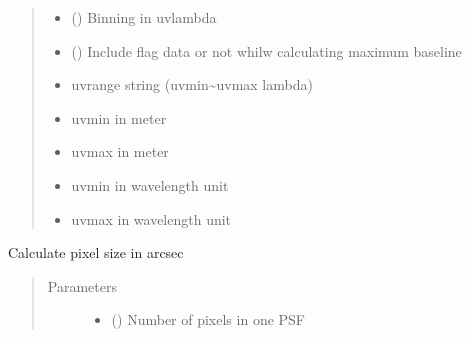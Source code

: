 \documentclass[letterpaper,10pt,english]{sphinxmanual}
\begin{document}
\begin{fulllineitems}
\begin{fulllineitems}
\begin{quote}
\begin{description}
\begin{itemize}
\item {} 
\sphinxAtStartPar
{} () \textendash{} Binning in uv\sphinxhyphen{}lambda

\item {} 
\sphinxAtStartPar
{} () \textendash{} Include flag data or not whilw calculating maximum baseline

\end{itemize}

\item[{Returns}] \leavevmode
\sphinxAtStartPar
\begin{itemize}
\item {} 
\sphinxAtStartPar
{} \textendash{} uv\sphinxhyphen{}range string (uvmin\textasciitilde{}uvmax lambda)

\item {} 
\sphinxAtStartPar
{} \textendash{} uvmin in meter

\item {} 
\sphinxAtStartPar
{} \textendash{} uvmax in meter

\item {} 
\sphinxAtStartPar
{} \textendash{} uvmin in wavelength unit

\item {} 
\sphinxAtStartPar
{} \textendash{} uvmax in wavelength unit

\end{itemize}


\end{description}\end{quote}

\end{fulllineitems}


\begin{fulllineitems}
\label{\detokenize{paircars:paircars.basic_func.ImageBasic.calc_cellsize}}
\sphinxAtStartPar
Calculate pixel size in arcsec
\begin{quote}\begin{description}
\item[{Parameters}] \leavevmode\begin{itemize}
\item {} 
\sphinxAtStartPar
{} () \textendash{} Number of pixels in one PSF


\end{itemize}
\end{description}
\end{quote}
\end{fulllineitems}
\end{fulllineitems}
\end{document}
